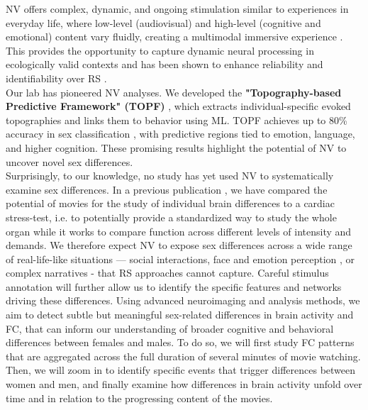 \documentclass[11pt,a4paper]{article}
\begin{document}
NV offers complex, dynamic, and ongoing stimulation similar to experiences in everyday life, 
where low-level (audiovisual) and high-level (cognitive and emotional) content vary fluidly, 
creating a multimodal immersive experience \parencite{sonkusareNaturalisticStimuliNeuroscience2019}. 
This provides the opportunity to capture dynamic neural processing in ecologically valid contexts 
\parencite{vanderwalMoviesMagnetNaturalistic2019} and has been shown to enhance reliability and identifiability 
over RS \parencite{krollNaturalisticViewingIncreases2023}.\\
Our lab has pioneered NV analyses. We developed the \textbf{"Topography-based Predictive Framework" (TOPF)}
\parencite{liTopographybasedPredictiveFramework2023a}, which extracts individual-specific evoked 
topographies and links them to behavior using ML.
TOPF achieves up to 80\% accuracy in sex classification \parencite{liStimulusSelectionInfluences2025a}, 
with predictive regions tied to emotion, language, and higher cognition. 
These promising results highlight the potential of NV to uncover novel sex differences.\\
Surprisingly, to our knowledge, no study has yet used NV to systematically examine sex differences. 
In a previous publication \parencite{eickhoffClinicalApplicationsMovie2020a}, we have compared the potential of 
movies for the study of individual brain differences to a cardiac stress-test, 
i.e. to potentially provide a standardized way to study the whole organ while it works to compare function 
across different levels of intensity and demands. 
We therefore expect NV to expose sex differences across a wide range of real-life-like situations — social interactions, 
face and emotion perception \parencite{sonkusareNaturalisticStimuliNeuroscience2019}, 
or complex narratives - that RS approaches cannot capture. Careful stimulus annotation will further allow us to identify the 
specific features and networks driving these differences.
Using advanced neuroimaging and analysis methods, we aim to detect subtle but meaningful sex-related differences 
in brain activity and FC, that can inform our understanding of 
broader cognitive and behavioral differences between females and males.
To do so, we will first study FC patterns that are aggregated across the full duration of several minutes of movie watching. 
Then, we will zoom in to
identify specific events that trigger differences between women and men, and finally examine how differences in brain activity
unfold over time and in relation to the progressing content of the movies.\\
\end{document}
